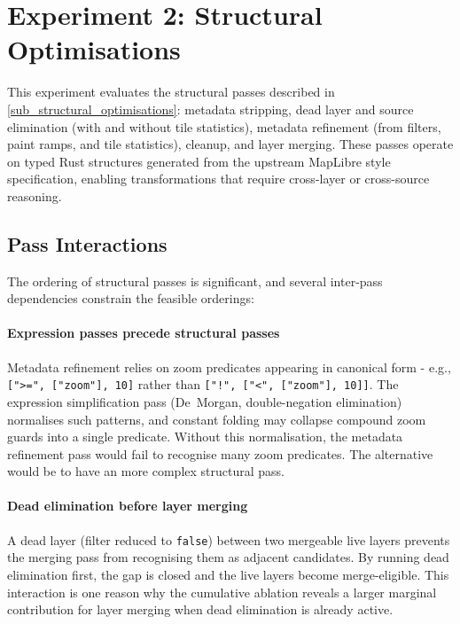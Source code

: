 \section{Experiment 2: Structural Optimisations}\label{sec_exp_structural}

This experiment evaluates the structural passes described in \cref{sub_structural_optimisations}: metadata stripping, dead layer and source elimination (with and without tile statistics), metadata refinement (from filters, paint ramps, and tile statistics), cleanup, and layer merging.
These passes operate on typed Rust structures generated from the upstream MapLibre style specification, enabling transformations that require cross-layer or cross-source reasoning.

\subsection{Pass Interactions}\label{sub_structural_interactions}

The ordering of structural passes is significant, and several inter-pass dependencies constrain the feasible orderings:

\paragraph{Expression passes precede structural passes}
\begin{sloppypar}
Metadata refinement relies on zoom predicates appearing in canonical form - e.g., \texttt{[">=",\allowbreak{} ["zoom"],\allowbreak{} 10]} rather than \texttt{["!",\allowbreak{} ["<",\allowbreak{} ["zoom"],\allowbreak{} 10]]}.
The expression simplification pass (De~Morgan, double-negation elimination) normalises such patterns, and constant folding may collapse compound zoom guards into a single predicate.
Without this normalisation, the metadata refinement pass would fail to recognise many zoom predicates.
The alternative would be to have an more complex structural pass.
\end{sloppypar}

\paragraph{Dead elimination before layer merging}
A dead layer (filter reduced to \texttt{false}) between two mergeable live layers prevents the merging pass from recognising them as adjacent candidates.
By running dead elimination first, the gap is closed and the live layers become merge-eligible.
This interaction is one reason why the cumulative ablation reveals a larger marginal contribution for layer merging when dead elimination is already active.


